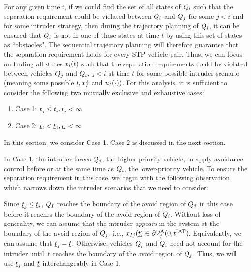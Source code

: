 For any given time $t$, if we could find the set of all states of $Q_i$ such that the separation requirement could be violated between $Q_i$ and $Q_j$ for some $j<i$ and for some intruder strategy, then during the trajectory planning of $Q_i$, it can be ensured that $Q_i$ is not in one of these states at time $t$ by using this set of states as ``obstacles". The sequential trajectory planning will therefore guarantee that the separation requirement holds for every STP vehicle pair. Thus, we can focus on finding all states $x_i(t)$ such that the separation requirements could be violated between vehicles $Q_j$ and $Q_i$, $j <i$ at time $t$ for some possible intruder scenario (meaning some possible $\underline{t}, x_{I}^0$ and $u_{I}(\cdot))$. For this analysis, it is sufficient to consider the following two mutually exclusive and exhaustive cases: 
\begin{enumerate}
\item Case 1: $\underline{t}_j \leq \underline{t}_i, \underline{t}_j < \infty$
\item Case 2: $\underline{t}_i < \underline{t}_j, \underline{t}_i <\infty$
\end{enumerate}
In this section, we consider Case 1. Case 2 is discussed in the next section.  

In Case 1, the intruder forces $Q_j$, the higher-priority vehicle, to apply avoidance control before or at the same time as $Q_i$, the lower-priority vehicle. %
To ensure the separation requirement in this case, we begin with the following observation which narrows down the intruder scenarios that we need to consider:
\begin{observation} \label{obs1_case1}
Since $\underline{t}_j \leq \underline{t}_i$, $Q_{I}$ reaches the boundary of the avoid region of $Q_j$ in this case before it reaches the boundary of the avoid region of $Q_i$. Without loss of generality, we can assume that the intruder \textit{appears} in the system at the boundary of the avoid region of $Q_j$, i.e., $x_{I j}(\underline{t}) \in \partial \mathcal{V}^{\text{A}}_{j}(0, t^\text{IAT})$. Equivalently, we can assume that $\underline{t}_j = \underline{t}$. Otherwise, vehicles $Q_j$ and $Q_i$ need not account for the intruder until it reaches the boundary of the avoid region of $Q_j$. Thus, we will use $\underline{t}_j$ and $\underline{t}$ interchangeably in Case 1.
\end{observation}